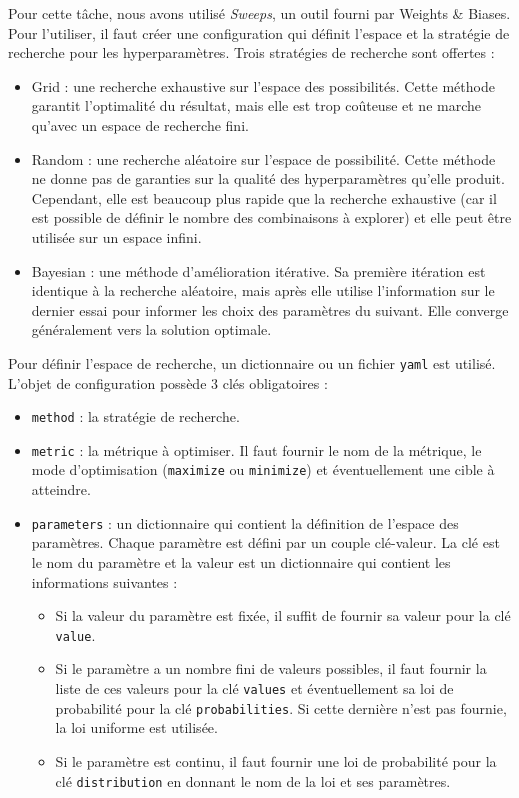 Pour cette tâche, nous avons utilisé \emph{\foreignlanguage{english}{Sweeps}},
un outil fourni par \foreignlanguage{english}{Weights \& Biases}.
Pour l'utiliser, il faut créer une configuration qui définit l'espace et la stratégie de recherche pour les hyperparamètres.
Trois stratégies de recherche sont offertes :

\begin{itemize}
    \item \foreignlanguage{english}{Grid} : une recherche exhaustive sur l'espace des possibilités.
    Cette méthode garantit l'optimalité du résultat, mais elle est trop coûteuse 
    et ne marche qu'avec un espace de recherche fini.
    \item \foreignlanguage{english}{Random} : une recherche aléatoire sur l'espace de possibilité.
    Cette méthode ne donne pas de garanties sur la qualité des hyperparamètres qu'elle produit.
    Cependant, elle est beaucoup plus rapide que la recherche exhaustive 
    (car il est possible de définir le nombre des combinaisons à explorer)
    et elle peut être utilisée sur un espace infini.
    \item \foreignlanguage{english}{Bayesian} : une méthode d'amélioration itérative.
    Sa première itération est identique à la recherche aléatoire,
    mais après elle utilise l'information sur le dernier essai pour informer les choix des paramètres du suivant.
    Elle converge généralement vers la solution optimale.
\end{itemize}

Pour définir l'espace de recherche, un dictionnaire ou un fichier \verb|yaml| est utilisé.
L'objet de configuration possède 3 clés obligatoires :

\begin{itemize}
    \item \verb|method| : la stratégie de recherche.
    \item \verb|metric| : la métrique à optimiser. Il faut fournir le nom de la métrique, le mode d'optimisation
    (\verb|maximize| ou \verb|minimize|) et éventuellement une cible à atteindre.
    \item \verb|parameters| : un dictionnaire qui contient la définition de l'espace des paramètres.
    Chaque paramètre est défini par un couple clé-valeur.
    La clé est le nom du paramètre et la valeur est un dictionnaire qui contient les informations suivantes :
    \begin{itemize}
        \item Si la valeur du paramètre est fixée, il suffit de fournir sa valeur pour la clé \verb|value|.
        \item Si le paramètre a un nombre fini de valeurs possibles, il faut fournir la liste de ces valeurs
        pour la clé \verb|values| et éventuellement sa loi de probabilité pour la clé \verb|probabilities|.
        Si cette dernière n'est pas fournie, la loi uniforme est utilisée.
        \item Si le paramètre est continu, il faut fournir une loi de probabilité pour la clé \verb|distribution|
        en donnant le nom de la loi et ses paramètres.
    \end{itemize}
\end{itemize}

